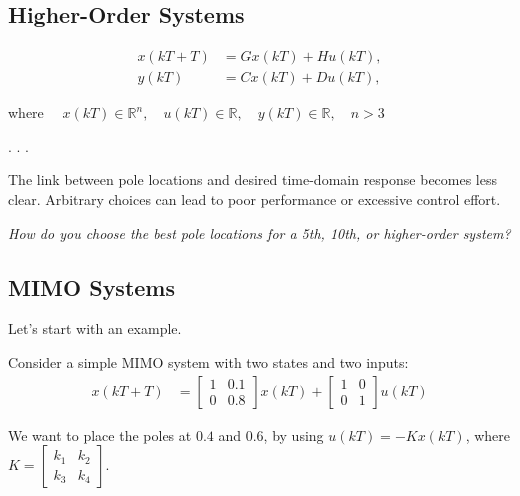 \documentclass[
  letterpaper,
  DIV=11,
  numbers=noendperiod,
  oneside]{scrartcl}
\begin{document}
\subsection{Higher-Order Systems}\label{higher-order-systems}

\[
\begin{align*} x(kT+T) &= Gx(kT) + Hu(kT), \\ y(kT) &= Cx(kT) + Du(kT), \end{align*}
\]

where
\(\quad x(kT) \in \mathbb{R}^n, \quad u(kT) \in \mathbb{R}, \quad y(kT) \in \mathbb{R}, \quad n > 3\)

. . .

\begin{tcolorbox}[enhanced jigsaw, rightrule=.15mm, coltitle=black, titlerule=0mm, breakable, title=\textcolor{quarto-callout-important-color}{\faExclamation}\hspace{0.5em}{Important}, bottomrule=.15mm, colback=white, toprule=.15mm, opacityback=0, opacitybacktitle=0.6, leftrule=.75mm, left=2mm, colbacktitle=quarto-callout-important-color!10!white, bottomtitle=1mm, toptitle=1mm, arc=.35mm, colframe=quarto-callout-important-color-frame]

The link between pole locations and desired time-domain response becomes
less clear. Arbitrary choices can lead to poor performance or excessive
control effort.

\emph{How do you choose the best pole locations for a 5th, 10th, or
higher-order system?}

\end{tcolorbox}

\subsection{MIMO Systems}\label{mimo-systems}

Let's start with an example.

Consider a simple MIMO system with two states and two inputs: \[
\begin{align*} x(kT+T) &= \begin{bmatrix} 1 & 0.1 \\ 0 & 0.8 \end{bmatrix} x(kT) + \begin{bmatrix} 1 & 0 \\ 0 & 1 \end{bmatrix} u(kT)
\end{align*} 
\]

We want to place the poles at \(0.4\) and \(0.6\), by using
\(u(kT) = -Kx(kT)\), where
\(K = \begin{bmatrix} k_1 & k_2 \\ k_3 & k_4\end{bmatrix}\).
\end{document}

